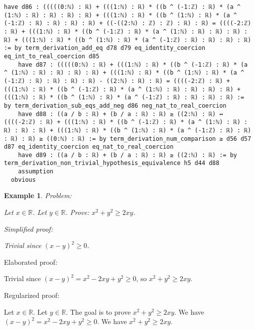 \documentclass{article}
\newtheorem{example}{Example}
\begin{document}
\begin{tcolorbox}[colback=white!10, width=\linewidth]
\begin{lstlisting}[language=Lean4]
    have d86 : (((((0:ℕ) : ℝ) + (((1:ℕ) : ℝ) * ((b ^ (-1:ℤ) : ℝ) * (a ^ (1:ℕ) : ℝ) : ℝ) : ℝ) : ℝ) + (((1:ℕ) : ℝ) * ((b ^ (1:ℕ) : ℝ) * (a ^ (-1:ℤ) : ℝ) : ℝ) : ℝ) : ℝ) + ((-((2:ℕ) : ℤ) : ℤ) : ℝ) : ℝ) = ((((-2:ℤ) : ℝ) + (((1:ℕ) : ℝ) * ((b ^ (-1:ℤ) : ℝ) * (a ^ (1:ℕ) : ℝ) : ℝ) : ℝ) : ℝ) + (((1:ℕ) : ℝ) * ((b ^ (1:ℕ) : ℝ) * (a ^ (-1:ℤ) : ℝ) : ℝ) : ℝ) : ℝ) := by term_derivation_add_eq d78 d79 eq_identity_coercion eq_int_to_real_coercion d85
    have d87 : (((((0:ℕ) : ℝ) + (((1:ℕ) : ℝ) * ((b ^ (-1:ℤ) : ℝ) * (a ^ (1:ℕ) : ℝ) : ℝ) : ℝ) : ℝ) + (((1:ℕ) : ℝ) * ((b ^ (1:ℕ) : ℝ) * (a ^ (-1:ℤ) : ℝ) : ℝ) : ℝ) : ℝ) - ((2:ℕ) : ℝ) : ℝ) = ((((-2:ℤ) : ℝ) + (((1:ℕ) : ℝ) * ((b ^ (-1:ℤ) : ℝ) * (a ^ (1:ℕ) : ℝ) : ℝ) : ℝ) : ℝ) + (((1:ℕ) : ℝ) * ((b ^ (1:ℕ) : ℝ) * (a ^ (-1:ℤ) : ℝ) : ℝ) : ℝ) : ℝ) := by term_derivation_sub_eqs_add_neg d86 neg_nat_to_real_coercion
    have d88 : ((a / b : ℝ) + (b / a : ℝ) : ℝ) ≥ ((2:ℕ) : ℝ) ↔ ((((-2:ℤ) : ℝ) + (((1:ℕ) : ℝ) * ((b ^ (-1:ℤ) : ℝ) * (a ^ (1:ℕ) : ℝ) : ℝ) : ℝ) : ℝ) + (((1:ℕ) : ℝ) * ((b ^ (1:ℕ) : ℝ) * (a ^ (-1:ℤ) : ℝ) : ℝ) : ℝ) : ℝ) ≥ ((0:ℕ) : ℝ) := by term_derivation_num_comparison ≥ d56 d57 d87 eq_identity_coercion eq_nat_to_real_coercion
    have d89 : ((a / b : ℝ) + (b / a : ℝ) : ℝ) ≥ ((2:ℕ) : ℝ) := by term_derivation_non_trivial_hypothesis_equivalence h5 d44 d88
    assumption
  obvious

\end{lstlisting}
\end{tcolorbox}


\begin{example}
Problem:
\begin{tcolorbox}[colback=yellow!10, width=\linewidth]
Let $x\in\mathbb{R}$. Let $y\in\mathbb{R}$.
    Prove: $x^2 + y^2 \ge 2xy$.
\end{tcolorbox}

Simplified proof:
\begin{tcolorbox}[colback=blue!10, width=\linewidth]
Trivial since $(x-y)^2 \ge 0$.
\end{tcolorbox}
\end{example}

Elaborated proof:
\begin{tcolorbox}[colback=green!10, width=\linewidth]
Trivial since $(x-y)^2 = x^2 -2xy + y^2 \ge 0$, so $x^2 + y^2 \ge 2xy$.
\end{tcolorbox}

Regularized proof:
\begin{tcolorbox}[colback=red!10, width=\linewidth]
Let $x\in\mathbb{R}$.
Let $y\in\mathbb{R}$.
The goal is to prove $x^2 + y^2 \ge 2xy$.
We have ${{(x-y)}}^2 = x^2 -2xy + y^2 \ge 0$.
We have $x^2 + y^2 \ge 2xy$.
\end{tcolorbox}
\end{document}
